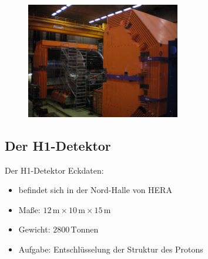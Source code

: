 \documentclass[aspectratio=1610, 9pt]{beamer}
\begin{document}
\begin{frame}
  \begin{figure}
    \centering
    \includegraphics[width=0.6\textwidth]{images/Zeus-Real.jpeg}
  \end{figure}
\end{frame}

\subsection{Der H1-Detektor}

\begin{frame}{Der H1-Detektor}
  Eckdaten:
  \begin{itemize}
    \item{befindet sich in der Nord-Halle von HERA}
    \item{Maße: $12 \,\mathrm{m} \times 10 \,\mathrm{m} \times 15 \,\mathrm{m}  $  }
    \item{Gewicht: $2800 \,\mathrm{Tonnen}$ }
    \item{Aufgabe: Entschlüsselung der Struktur des Protons}
  \end{itemize}
\end{frame}
\end{document}
